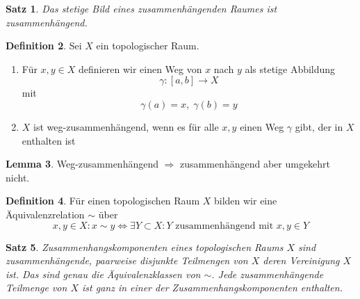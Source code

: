 \documentclass[a4paper, 12pt]{article}
\theoremstyle{plain}
\newtheorem{theorem}{Satz}[section] %
\theoremstyle{definition}
\newtheorem{definition}[theorem]{Definition} %
\theoremstyle{lemma}
\newtheorem{lemma}[theorem]{Lemma}
\theoremstyle{remark}
\theoremstyle{corollary}
\theoremstyle{example}
\begin{document}
	\begin{theorem}
		Das stetige Bild eines zusammenhängenden Raumes ist zusammenhängend.
	\end{theorem}
	\begin{definition}
		Sei $X$ ein topologischer Raum. \begin{enumerate}
			\item Für $x,y \in X$ definieren wir einen Weg von $x$ nach $y$ als stetige Abbildung \[\gamma: [a,b] \to X\] mit \[\gamma(a) = x, \; \gamma(b) = y\]
			\item $X$ ist weg-zusammenhängend, wenn es für alle $x,y$ einen Weg $\gamma$ gibt, der in $X$ enthalten ist
		\end{enumerate}
	\end{definition}
	\begin{lemma}
		Weg-zusammenhängend $\Rightarrow$ zusammenhängend aber umgekehrt nicht.
	\end{lemma}
	\begin{definition}
		Für einen topologischen Raum $X$ bilden wir eine Äquivalenzrelation $\sim$ über \[x,y \in X: x \sim y \Leftrightarrow \exists Y \subset X: Y \text{ zusammenhängend mit } x,y \in Y\] 
	\end{definition}
	\begin{theorem}
		Zusammenhangskomponenten eines topologischen Raums $X$ sind zusammenhängende, paarweise disjunkte Teilmengen von $X$ deren Vereinigung $X$ ist. Das sind genau die Äquivalenzklassen von $\sim$. Jede zusammenhängende Teilmenge von $X$ ist ganz in einer der Zusammenhangskomponenten enthalten.
	\end{theorem}
\end{document}
